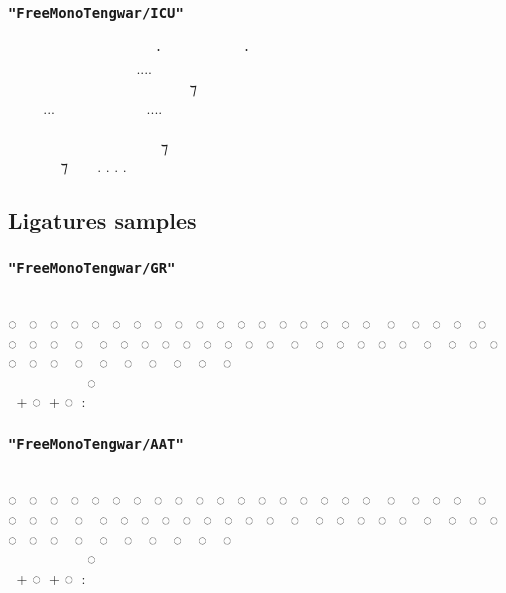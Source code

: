 \documentclass{article}
\begin{document}
\subsubsection*{\texttt{"FreeMonoTengwar/ICU"}}

\freeICU
  ‍   ⸱‍  ‍ ⸱ \\
    ‍....  ‍  \\
  ‍   ‍ ‍ ⁊ ‍  \\
...  ....   \\
         ‍ \\
 ‍ ‍‍   ⁊  ‍ ‍ \\
 ‍ ⁊  . . . . \normalfont


\newpage

\subsection{Ligatures samples}

\subsubsection*{\texttt{"FreeMonoTengwar/GR"}}

\freeGR
                          \\
◌ ◌ ◌ ◌ ◌ ◌ ◌ ◌ ◌ ◌ ◌ ◌ ◌ ◌ ◌ ◌ ◌ ◌ ◌ ◌ ◌ ◌ ◌ ◌ ◌ ◌ ◌ ◌ ◌ ◌ ◌ ◌ ◌ ◌ ◌ ◌ ◌ ◌ ◌ ◌ ◌ ◌ ◌ ◌ ◌ ◌ ◌ ◌ ◌ ◌ ◌ ◌ ◌ ◌ ◌ ◌\\
      ◌‍ ‍ ‍ ‍ \\
 \normalfont + \freeGR ◌ \normalfont + \freeGR ◌ : 

\subsubsection*{\texttt{"FreeMonoTengwar/AAT"}}

\freeAAT
                          \\
◌ ◌ ◌ ◌ ◌ ◌ ◌ ◌ ◌ ◌ ◌ ◌ ◌ ◌ ◌ ◌ ◌ ◌ ◌ ◌ ◌ ◌ ◌ ◌ ◌ ◌ ◌ ◌ ◌ ◌ ◌ ◌ ◌ ◌ ◌ ◌ ◌ ◌ ◌ ◌ ◌ ◌ ◌ ◌ ◌ ◌ ◌ ◌ ◌ ◌ ◌ ◌ ◌ ◌ ◌ ◌\\
      ◌‍ ‍ ‍ ‍ \\
 \normalfont + \freeAAT ◌ \normalfont + \freeAAT ◌ : 
\end{document}
